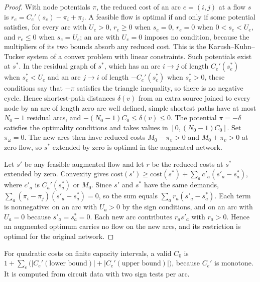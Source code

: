 \begin{proof}
With node potentials $\pi$, the reduced cost of an arc $e=(i,j)$ at a flow
$s$ is $r_e=C_e'(s_e)-\pi_i+\pi_j$. A feasible flow is optimal if and only if
some potential satisfies, for every arc with $U_e>0$, $r_e\ge0$ when $s_e=0$,
$r_e=0$ when $0<s_e<U_e$, and $r_e\le0$ when $s_e=U_e$; an arc with $U_e=0$
imposes no condition, because the multipliers of its two bounds absorb any
reduced cost. This is the Karush--Kuhn--Tucker system of a convex problem
with linear constraints. Such potentials exist at $s^*$. In the
residual graph of $s^*$, which has an arc $i\to j$ of length $C_e'(s^*_e)$ when
$s^*_e<U_e$ and an arc $j\to i$ of length $-C_e'(s^*_e)$ when $s^*_e>0$, these
conditions say that $-\pi$ satisfies the triangle inequality, so there is no
negative cycle. Hence shortest-path distances $\delta(v)$ from an extra source
joined to every node by an arc of length zero are well defined, simple
shortest paths have at most $N_0-1$ residual arcs, and
$-(N_0-1)C_0\le\delta(v)\le0$. The potential $\pi=-\delta$ satisfies the
optimality conditions and takes values in $[0,(N_0-1)C_0]$. Set
$\pi_\omega=0$. The new arcs then have reduced costs $M_0-\pi_v>0$ and
$M_0+\pi_v>0$ at zero flow, so $s^*$ extended by zero is optimal in the
augmented network.

Let $s'$ be any feasible augmented flow and let $r$ be the reduced costs at
$s^*$ extended by zero. Convexity gives
$\mathrm{cost}(s')\ge\mathrm{cost}(s^*)+\sum_a c'_a(s'_a-s^*_a)$, where
$c'_a$ is $C_a'(s^*_a)$ or $M_0$. Since $s'$ and $s^*$ have the same demands,
$\sum_a(\pi_i-\pi_j)(s'_a-s^*_a)=0$, so the sum equals
$\sum_ar_a(s'_a-s^*_a)$. Each term is nonnegative: on an arc with $U_a>0$ by
the sign conditions, and on an arc with $U_a=0$ because
$s'_a=s^*_a=0$. Each new arc contributes $r_as'_a$ with $r_a>0$. Hence an
augmented optimum carries no flow on the new arcs, and its restriction is
optimal for the original network.
\end{proof}

For quadratic costs on finite capacity intervals, a valid $C_0$ is
$1+\sum_e\bigl(|C_e'(\text{lower bound})|+|C_e'(\text{upper bound})|\bigr)$,
because $C_e'$ is monotone. It is computed from circuit data with two sign
tests per arc.

